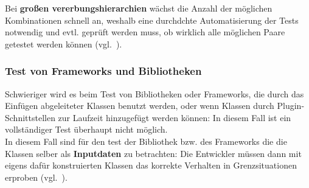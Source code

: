 \noindent
Bei \textbf{großen vererbungshierarchien} wächst die Anzahl der möglichen Kombinationen schnell an, weshalb eine durchdchte Automatisierung der Tests notwendig und evtl. geprüft werden muss, ob wirklich alle möglichen Paare getestet werden können (vgl.~\cite[61]{Wed09c}).

\subsubsection*{Test von Frameworks und Bibliotheken}
Schwieriger wird es beim Test von Bibliotheken oder Frameworks, die durch das Einfügen abgeleiteter Klassen benutzt werden, oder wenn Klassen durch Plugin-Schnittstellen zur Laufzeit hinzugefügt werden können: In diesem Fall ist ein vollständiger Test überhaupt nicht möglich.\\
In diesem Fall sind für den test der Bibliothek bzw. des Frameworks die die Klassen selber als \textbf{Inputdaten} zu betrachten: Die Entwickler müssen dann mit eigens dafür konstruierten Klassen das korrekte Verhalten in Grenzsituationen erproben (vgl.~\cite[62]{Wed09c}).